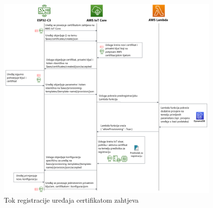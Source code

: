 \begin{figure}[ht]
	\centering
	\includegraphics[scale=0.2]{imgs/fleet_provisioning_by_claim}
	\caption{Tok registracije uređaja certifikatom zahtjeva \cite{aws_docs}}
	\label{fig:fleet_provisioning_by_claim}
\end{figure}

